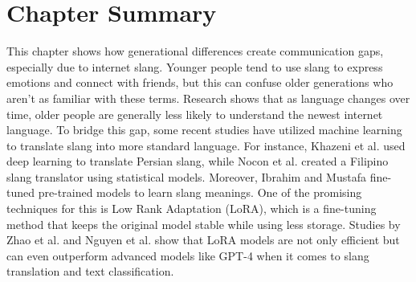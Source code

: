 \section{Chapter Summary}
This chapter shows how generational differences create communication gaps, especially due to internet slang.
Younger people tend to use slang to express emotions and connect with friends, but this can confuse older generations who aren't as familiar with these terms.
Research shows that as language changes over time, older people are generally less likely to understand the newest internet language.
To bridge this gap, some recent studies have utilized machine learning to translate slang into more standard language.
For instance, Khazeni et al. \cite{Khazeni} used deep learning to translate Persian slang, while Nocon et al. \cite{Nocon_Kho_Arroyo_2018} created a Filipino slang translator using statistical models.
Moreover, Ibrahim and Mustafa \cite{Abdulstar_Ibrahim_Shareef_Mustafa_2023} fine-tuned pre-trained models to learn slang meanings.
One of the promising techniques for this is Low Rank Adaptation (LoRA), which is a fine-tuning method that keeps the original model stable while using less storage.
Studies by Zhao et al. \cite{zhao2024loraland310finetuned} and Nguyen et al. \cite{nguyen2023finetuningllama2large} show that LoRA models are not only efficient but can even outperform advanced models like GPT-4 when it comes to slang translation and text classification. 
